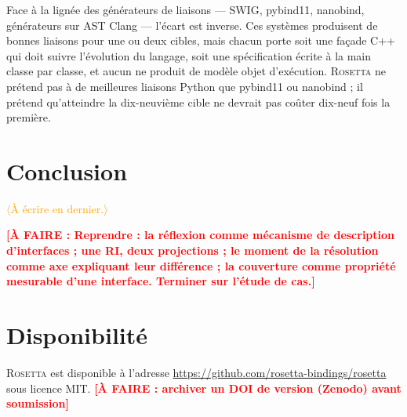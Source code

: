 \documentclass[11pt,a4paper]{article}
\newcommand{\todo}[1]{\textcolor{red}{\textbf{[À FAIRE : #1]}}}
\newcommand{\gap}[1]{\textcolor{orange}{\textsf{\small$\langle$#1$\rangle$}}}
\newcommand{\rosetta}{\textsc{Rosetta}}
\begin{document}
Face à la lignée des générateurs de liaisons --- SWIG, pybind11, nanobind,
générateurs sur AST Clang --- l'écart est inverse. Ces systèmes produisent de
bonnes liaisons pour une ou deux cibles, mais chacun porte soit une façade C++
qui doit suivre l'évolution du langage, soit une spécification écrite à la main
classe par classe, et aucun ne produit de modèle objet d'exécution. \rosetta{} ne
prétend pas à de meilleures liaisons Python que pybind11 ou nanobind ; il prétend
qu'atteindre la dix-neuvième cible ne devrait pas coûter dix-neuf fois la
première.

\section{Conclusion}
\label{sec:conclusion}

\gap{À écrire en dernier.}

\todo{Reprendre : la réflexion comme mécanisme de description d'interfaces ; une
RI, deux projections ; le moment de la résolution comme axe expliquant leur
différence ; la couverture comme propriété mesurable d'une interface. Terminer
sur l'étude de cas.}

\section*{Disponibilité}
\rosetta{} est disponible à l'adresse
\url{https://github.com/rosetta-bindings/rosetta} sous licence MIT.
\todo{archiver un DOI de version (Zenodo) avant soumission}



\end{document}
